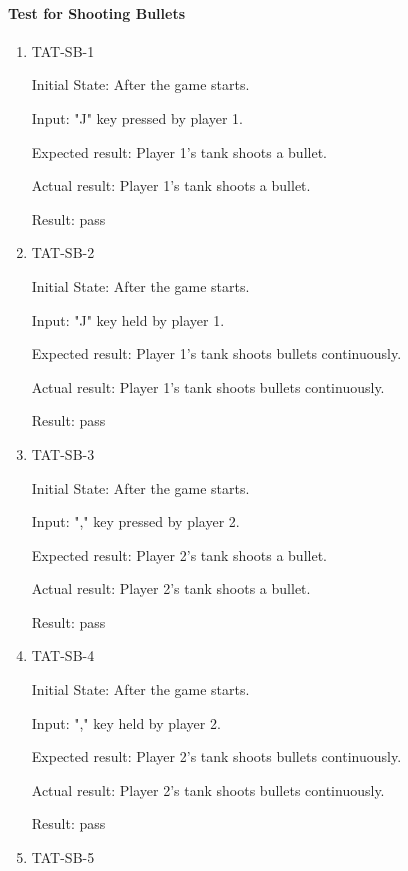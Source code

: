 \documentclass[12pt, titlepage]{article}
\begin{document}
\paragraph{Test for Shooting Bullets}

\begin{enumerate}

\item{TAT-SB-1\\}
					
Initial State: After the game starts.
					
Input: "J" key pressed by player 1.
					
Expected result: Player 1's tank shoots a bullet.
					
Actual result: Player 1's tank shoots a bullet.

Result: pass

\item{TAT-SB-2\\}
					
Initial State: After the game starts.
					
Input: "J" key held by player 1.
					
Expected result: Player 1's tank shoots bullets continuously. 
					
Actual result: Player 1's tank shoots bullets continuously. 

Result: pass

\item{TAT-SB-3\\}
					
Initial State: After the game starts.
					
Input: "," key pressed by player 2.
					
Expected result: Player 2's tank shoots a bullet.
					
Actual result: Player 2's tank shoots a bullet.

Result: pass

\item{TAT-SB-4\\}
					
Initial State: After the game starts.
					
Input: "," key held by player 2.
					
Expected result: Player 2's tank shoots bullets continuously. 
					
Actual result: Player 2's tank shoots bullets continuously.

Result: pass

\item{TAT-SB-5\\}
					

\end{enumerate}
\end{document}

